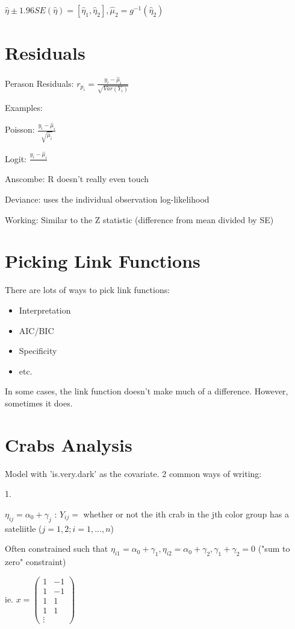 \documentclass{article}
\begin{document}
$\hat{\eta} \pm 1.96 SE(\hat{\eta}) = [\hat{\eta}_1, \hat{\eta}_2], \hat{\mu}_2 = g^{-1}(\hat{\eta}_2)$

\section{Residuals}

Perason Residuals: $r_{p_i} = \frac{y_i - \hat{\mu}_i}{\sqrt{Var(Y_i)}}$

Examples: 

Poisson: $\frac{y_i - \hat{\mu}_i}{\sqrt{\hat{\mu}_i}}$

Logit: $\frac{y_i - \hat{\mu}_i}{}$

Anscombe: R doesn't really even touch

Deviance: uses the individual observation log-likelihood

Working: Similar to the Z statistic (difference from mean divided by SE)

\section{Picking Link Functions}

There are lots of ways to pick link functions:
\begin{itemize}
    \item Interpretation
    \item AIC/BIC
    \item Specificity
    \item etc.
\end{itemize}

In some cases, the link function doesn't make much of a difference. However, sometimes it does. 

\section{Crabs Analysis}

Model with 'is.very.dark' as the covariate. 2 common ways of writing:

1. 

$\eta_{ij} = \alpha_0 + \gamma_j$ : $Y_{ij} = $ whether or not the ith crab in the jth color group has a sateliitle ($j  = 1, 2; i = 1, ..., n$)

Often constrained such that $\eta_{i1} = \alpha_0 + \gamma_1, \eta_{i2} = \alpha_0 + \gamma_2, \gamma_1 + \gamma_2 = 0$ ("sum to zero" constraint)

ie. $x = \begin{pmatrix}
    1 & -1 \\ 1 & -1 \\ 1 & 1 \\ 1 & 1 \\ \vdots
\end{pmatrix}$
\end{document}
